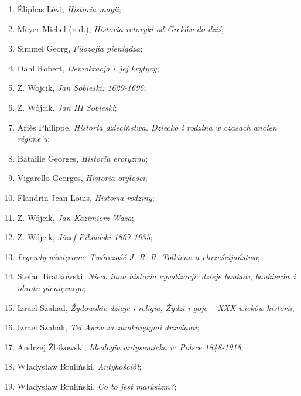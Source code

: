 \documentclass[a4paper,11pt]{article}
\begin{document}
\begin{enumerate}
\item Éliphas Lévi, \emph{Historia magii};

\item Meyer Michel (red.), \emph{Historia retoryki od Greków do dziś};

\item Simmel Georg, \emph{Filozofia pieniądza};

\item Dahl Robert, \emph{Demokracja i~jej krytycy};

\item Z. Wojcik, \emph{Jan Sobieski: 1629-1696};

\item Z. Wójcik, \emph{Jan III Sobieski};

\item Ariès Philippe, \emph{Historia dzieciństwa. Dziecko i rodzina w
    czasach ancien régime’u};

\item Bataille Georges, \emph{Historia erotyzmu};

\item Vigarello Georges, \emph{Historia otyłości};

\item Flandrin Jean-Louis, \emph{Historia rodziny};

\item Z. Wójcik, \emph{Jan Kazimierz Waza};

\item Z. Wójcik, \emph{Józef Piłsudski 1867-1935};

\item \emph{Legendy uświęcone. Twórczość J. R. R. Tolkiena a
    chrześcijaństwo};

\item Stefan Bratkowski, \emph{Nieco inna historia cywilizacji: dzieje
    banków, bankierów i obrotu pieniężnego};

\item Izrael Szahad, \emph{Żydowskie dzieje i religia; Żydzi i goje –
    XXX wieków historii};

\item Izrael Szahak, \emph{Tel Awiw za zamkniętymi drzwiami};

\item Andrzej Żbikowski, \emph{Ideologia antysemicka w~Polsce
    1848-1918};

\item Władysław Bruliński, \emph{Antykościół};

\item Władysław Bruliński, \emph{Co to jest marksizm?};


\end{enumerate}
\end{document}
